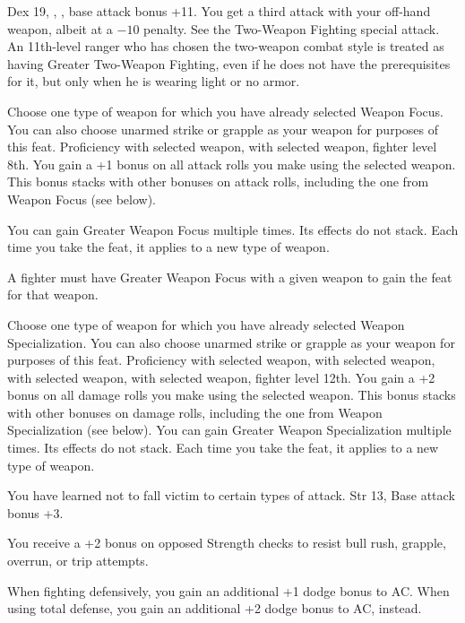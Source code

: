 {}
{Dex 19, , , base attack bonus +11.}
{You get a third attack with your off-hand weapon, albeit at a $-10$ penalty. See the Two-Weapon Fighting special attack.}{}
{An 11th-level ranger who has chosen the two-weapon combat style is treated as having Greater Two-Weapon Fighting, even if he does not have the prerequisites for it, but only when he is wearing light or no armor.}

{Choose one type of weapon for which you have already selected Weapon Focus. You can also choose unarmed strike or grapple as your weapon for purposes of this feat.}
{Proficiency with selected weapon,  with selected weapon, fighter level 8th.}
{You gain a +1 bonus on all attack rolls you make using the selected weapon. This bonus stacks with other bonuses on attack rolls, including the one from Weapon Focus (see below).}{}
{You can gain Greater Weapon Focus multiple times. Its effects do not stack. Each time you take the feat, it applies to a new type of weapon.

A fighter must have Greater Weapon Focus with a given weapon to gain the  feat for that weapon.}

{Choose one type of weapon for which you have already selected Weapon Specialization. You can also choose unarmed strike or grapple as your weapon for purposes of this feat.}
{Proficiency with selected weapon,  with selected weapon,  with selected weapon,  with selected weapon, fighter level 12th.}
{You gain a +2 bonus on all damage rolls you make using the selected weapon. This bonus stacks with other bonuses on damage rolls, including the one from Weapon Specialization (see below).}{}
{You can gain Greater Weapon Specialization multiple times. Its effects do not stack. Each time you take the feat, it applies to a new type of weapon.}

{You have learned not to fall victim to certain types of attack.}
{Str 13, Base attack bonus +3.}
{You receive a +2 bonus on opposed Strength checks to resist bull rush, grapple, overrun, or trip attempts.

When fighting defensively, you gain an additional +1 dodge bonus to AC. When using total defense, you gain an additional +2 dodge bonus to AC, instead.}{}{}

